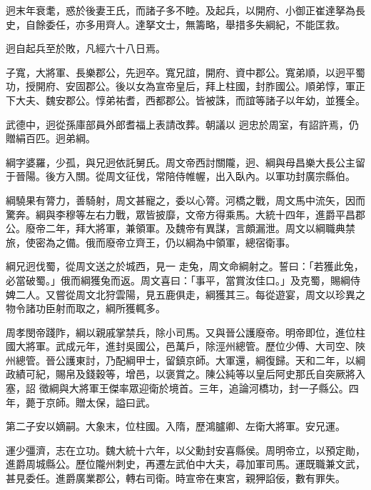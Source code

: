 \begin{pinyinscope}
 迥末年衰耄，惑於後妻王氏，而諸子多不睦。及起兵，以開府、小御正崔達拏為長史，自餘委任，亦多用齊人。達拏文士，無籌略，舉措多失綱紀，不能匡救。



 迥自起兵至於敗，凡經六十八日焉。



 子寬，大將軍、長樂郡公，先迥卒。寬兄誼，開府、資中郡公。寬弟順，以迥平蜀功，授開府、安固郡公。後以女為宣帝皇后，拜上柱國，封胙國公。順弟惇，軍正下大夫、魏安郡公。惇弟祐耆，西都郡公。皆被誅，而誼等諸子以年幼，並獲全。



 武德中，迥從孫庫部員外郎耆福上表請改葬。朝議以
 迥忠於周室，有詔許焉，仍贈絹百匹。迥弟綱。



 綱字婆羅，少孤，與兄迥依託舅氏。周文帝西討關隴，迥、綱與母昌樂大長公主留于晉陽。後方入關。從周文征伐，常陪侍帷幄，出入臥內。以軍功封廣宗縣伯。



 綱驍果有膂力，善騎射，周文甚寵之，委以心膂。河橋之戰，周文馬中流矢，因而驚奔。綱與李穆等左右力戰，眾皆披靡，文帝方得乘馬。大統十四年，進爵平昌郡公。廢帝二年，拜大將軍，兼領軍。及魏帝有異謀，言頗漏泄。周文以綱職典禁旅，使密為之備。俄而廢帝立齊王，仍以綱為中領軍，總宿衛事。



 綱兄迥伐蜀，從周文送之於城西，見一
 走兔，周文命綱射之。誓曰：「若獲此兔，必當破蜀。」俄而綱獲兔而返。周文喜曰：「事平，當賞汝佳口。」及克蜀，賜綱侍婢二人。又嘗從周文北狩雲陽，見五鹿俱走，綱獲其三。每從遊宴，周文以珍異之物令諸功臣射而取之，綱所獲輒多。



 周孝閔帝踐阼，綱以親戚掌禁兵，除小司馬。又與晉公護廢帝。明帝即位，進位柱國大將軍。武成元年，進封吳國公，邑萬戶，除涇州總管。歷位少傅、大司空、陜州總管。晉公護東討，乃配綱甲士，留鎮京師。大軍還，綱復歸。天和二年，以綱政績可紀，賜帛及錢穀等，增邑，以褒賞之。陳公純等以皇后阿史那氏自突厥將入塞，詔
 徵綱與大將軍王傑率眾迎衛於境首。三年，追論河橋功，封一子縣公。四年，薨于京師。贈太保，謚曰武。



 第二子安以嫡嗣。大象末，位柱國。入隋，歷鴻臚卿、左衛大將軍。安兄運。



 運少彊濟，志在立功。魏大統十六年，以父勳封安喜縣侯。周明帝立，以預定勛，進爵周城縣公。歷位隴州刺史，再遷左武伯中大夫，尋加軍司馬。運既職兼文武，甚見委任。進爵廣業郡公，轉右司衛。時宣帝在東宮，親狎諂佞，數有罪失。




\end{pinyinscope}
